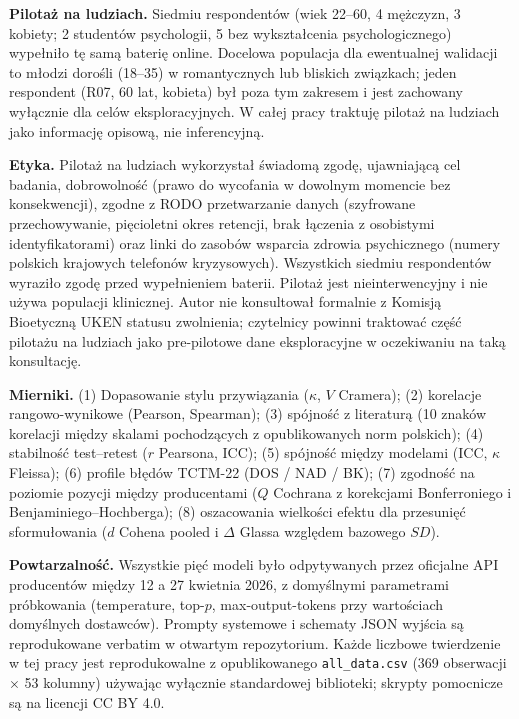 \documentclass[11pt,a4paper]{article}
\begin{document}
\textbf{Pilotaż na ludziach.} Siedmiu respondentów (wiek 22--60, 4 mężczyzn, 3 kobiety; 2 studentów psychologii, 5 bez wykształcenia psychologicznego) wypełniło tę samą baterię online. Docelowa populacja dla ewentualnej walidacji to młodzi dorośli (18--35) w romantycznych lub bliskich związkach; jeden respondent (R07, 60 lat, kobieta) był poza tym zakresem i jest zachowany wyłącznie dla celów eksploracyjnych. W całej pracy traktuję pilotaż na ludziach jako informację opisową, nie inferencyjną.

\textbf{Etyka.} Pilotaż na ludziach wykorzystał świadomą zgodę, ujawniającą cel badania, dobrowolność (prawo do wycofania w dowolnym momencie bez konsekwencji), zgodne z RODO przetwarzanie danych (szyfrowane przechowywanie, pięcioletni okres retencji, brak łączenia z osobistymi identyfikatorami) oraz linki do zasobów wsparcia zdrowia psychicznego (numery polskich krajowych telefonów kryzysowych). Wszystkich siedmiu respondentów wyraziło zgodę przed wypełnieniem baterii. Pilotaż jest nieinterwencyjny i nie używa populacji klinicznej. Autor nie konsultował formalnie z Komisją Bioetyczną UKEN statusu zwolnienia; czytelnicy powinni traktować część pilotażu na ludziach jako pre-pilotowe dane eksploracyjne w oczekiwaniu na taką konsultację.

\textbf{Mierniki.} (1) Dopasowanie stylu przywiązania ($\kappa$, $V$ Cramera); (2) korelacje rangowo-wynikowe (Pearson, Spearman); (3) spójność z literaturą (10 znaków korelacji między skalami pochodzących z opublikowanych norm polskich); (4) stabilność test--retest ($r$ Pearsona, ICC); (5) spójność między modelami (ICC, $\kappa$ Fleissa); (6) profile błędów TCTM-22 (DOS / NAD / BK); (7) zgodność na poziomie pozycji między producentami ($Q$ Cochrana z korekcjami Bonferroniego i Benjaminiego--Hochberga); (8) oszacowania wielkości efektu dla przesunięć sformułowania ($d$ Cohena pooled i $\Delta$ Glassa względem bazowego $SD$).

\textbf{Powtarzalność.} Wszystkie pięć modeli było odpytywanych przez oficjalne API producentów między 12 a 27 kwietnia 2026, z domyślnymi parametrami próbkowania (temperature, top-$p$, max-output-tokens przy wartościach domyślnych dostawców). Prompty systemowe i schematy JSON wyjścia są reprodukowane verbatim w otwartym repozytorium. Każde liczbowe twierdzenie w tej pracy jest reprodukowalne z opublikowanego \texttt{all\_data.csv} (369 obserwacji $\times$ 53 kolumny) używając wyłącznie standardowej biblioteki; skrypty pomocnicze są na licencji CC BY 4.0.
\end{document}
